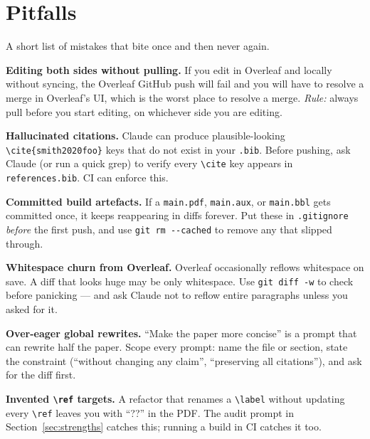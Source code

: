 \section{Pitfalls}
\label{sec:pitfalls}

A short list of mistakes that bite once and then never again.

\begin{pitfallbox}
\textbf{Editing both sides without pulling.} If you edit in Overleaf and locally without syncing, the Overleaf GitHub push will fail and you will have to resolve a merge in Overleaf's UI, which is the worst place to resolve a merge. \emph{Rule:} always pull before you start editing, on whichever side you are editing.
\end{pitfallbox}

\begin{pitfallbox}
\textbf{Hallucinated citations.} Claude can produce plausible-looking \verb|\cite{smith2020foo}| keys that do not exist in your \verb|.bib|. Before pushing, ask Claude (or run a quick grep) to verify every \verb|\cite| key appears in \verb|references.bib|. CI can enforce this.
\end{pitfallbox}

\begin{pitfallbox}
\textbf{Committed build artefacts.} If a \verb|main.pdf|, \verb|main.aux|, or \verb|main.bbl| gets committed once, it keeps reappearing in diffs forever. Put these in \verb|.gitignore| \emph{before} the first push, and use \verb|git rm --cached| to remove any that slipped through.
\end{pitfallbox}

\begin{pitfallbox}
\textbf{Whitespace churn from Overleaf.} Overleaf occasionally reflows whitespace on save. A diff that looks huge may be only whitespace. Use \verb|git diff -w| to check before panicking --- and ask Claude not to reflow entire paragraphs unless you asked for it.
\end{pitfallbox}

\begin{pitfallbox}
\textbf{Over-eager global rewrites.} ``Make the paper more concise'' is a prompt that can rewrite half the paper. Scope every prompt: name the file or section, state the constraint (``without changing any claim'', ``preserving all citations''), and ask for the diff first.
\end{pitfallbox}

\begin{pitfallbox}
\textbf{Invented \texttt{\textbackslash ref} targets.} A refactor that renames a \verb|\label| without updating every \verb|\ref| leaves you with ``??'' in the PDF. The audit prompt in Section~\ref{sec:strengths} catches this; running a build in CI catches it too.
\end{pitfallbox}

